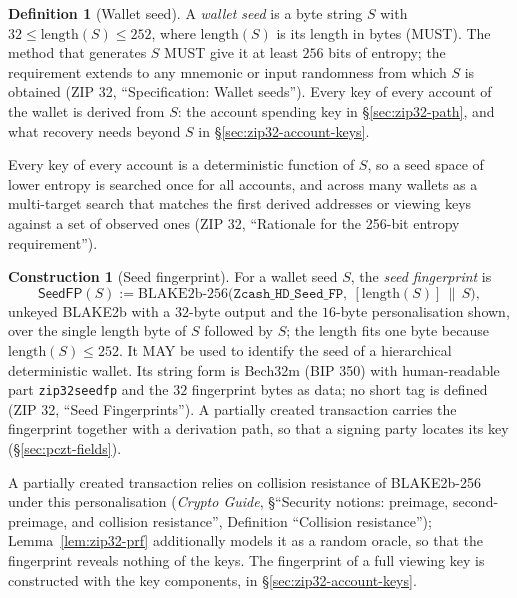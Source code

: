 \documentclass[11pt,a4paper]{article}
\theoremstyle{definition}
\newtheorem{definition}[theorem]{Definition}
\newtheorem{construction}[theorem]{Construction}
\begin{document}
\begin{definition}[Wallet seed]\label{def:zip32-seed}
A \emph{wallet seed} is a byte string $S$ with
$32 \le \mathrm{length}(S) \le 252$, where $\mathrm{length}(S)$ is its
length in bytes (MUST). The method that generates $S$ MUST give it at least
$256$ bits of entropy; the requirement extends to any mnemonic or input
randomness from which $S$ is obtained (ZIP 32, ``Specification: Wallet
seeds''). Every key of every account of the wallet is derived from $S$: the
account spending key in \S\ref{sec:zip32-path}, and what recovery needs
beyond $S$ in \S\ref{sec:zip32-account-keys}.
\end{definition}

Every key of every account is a deterministic function of $S$, so a seed
space of lower entropy is searched once for all accounts, and across many
wallets as a multi-target search that matches the first derived addresses
or viewing keys against a set of observed ones (ZIP 32, ``Rationale for the
256-bit entropy requirement'').

\begin{construction}[Seed fingerprint]\label{def:zip32-seedfp}
For a wallet seed $S$, the \emph{seed fingerprint} is
\[
  \mathsf{SeedFP}(S) := \mathrm{BLAKE2b\text{-}256}\bigl(
    \texttt{Zcash\_HD\_Seed\_FP},\
    [\mathrm{length}(S)] \,\|\, S\bigr),
\]
unkeyed BLAKE2b with a $32$-byte output and the $16$-byte personalisation
shown, over the single length byte of $S$ followed by $S$; the length fits
one byte because $\mathrm{length}(S) \le 252$. It MAY be used to identify
the seed of a hierarchical deterministic wallet. Its string form is
Bech32m (BIP 350) with human-readable part \texttt{zip32seedfp} and the $32$
fingerprint bytes as data; no short tag is defined (ZIP 32, ``Seed
Fingerprints''). A partially created transaction carries the fingerprint
together with a derivation path, so that a signing party locates its key
(\S\ref{sec:pczt-fields}).
\end{construction}

A partially created transaction relies on collision resistance of
BLAKE2b-256 under this personalisation (\emph{Crypto Guide}, \S``Security
notions: preimage, second-preimage, and collision resistance'', Definition
``Collision resistance''); Lemma~\ref{lem:zip32-prf} additionally models it
as a random oracle, so that the fingerprint reveals nothing of the keys. The
fingerprint of a full viewing key is constructed with the key
components, in \S\ref{sec:zip32-account-keys}.
\end{document}
